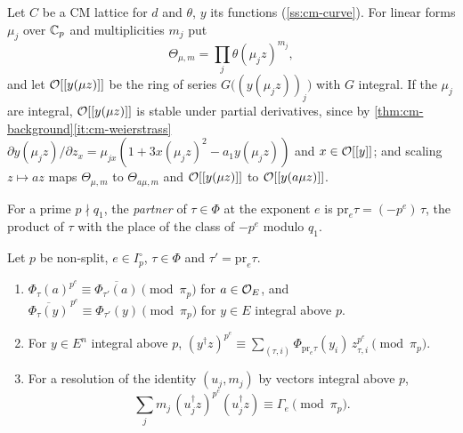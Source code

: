 Let $C$ be a CM lattice for $d$ and $\theta$, $y$ its functions (\cref{ss:cm-curve}). For linear forms
$\mu_j$ over $\mathbb{C}_p$ and multiplicities $m_j$ put
\[
  \Theta_{\mu,m}=\prod_j\theta(\mu_jz)^{m_j},
\]
and let $\mathcal{O}[[y(\mu z)]]$ be the ring of series $G\bigl((y(\mu_jz))_j\bigr)$ with $G$ integral. If the
$\mu_j$ are integral, $\mathcal{O}[[y(\mu z)]]$ is stable under partial derivatives, since by
\cref{thm:cm-background}\ref{it:cm-weierstrass} $\partial y(\mu_jz)/\partial z_x=\mu_{jx}(1+3x(\mu_jz)^2-
a_1y(\mu_jz))$ and $x\in\mathcal{O}[[y]]$; and scaling $z\mapsto az$ maps $\Theta_{\mu,m}$ to $\Theta_{a\mu,m}$
and $\mathcal{O}[[y(\mu z)]]$ to $\mathcal{O}[[y(a\mu z)]]$.

For a prime $p\nmid q_1$, the \emph{partner} of $\tau\in\Phi$ at the exponent $e$ is
$\mathrm{pr}_e\tau=(-p^e)\,\tau$, the product of $\tau$ with the place of the class of $-p^e$ modulo
$q_1$.

\begin{lemma}[Partners]\label{lem:partners}
Let $p$ be non-split, $e\in I_p^\circ$, $\tau\in\Phi$ and $\tau'=\mathrm{pr}_e\tau$.
\begin{enumerate}[label=\textup{(\alph*)}]
\item $\Phi_\tau(a)^{p^e}\equiv\overline{\Phi_{\tau'}(a)}\pmod{\pi_p}$ for $a\in\mathcal{O}_E$, and
$\overline{\Phi_\tau(y)}^{\,p^e}\equiv\Phi_{\tau'}(y)\pmod{\pi_p}$ for $y\in E$ integral above $p$.
\item For $y\in E^n$ integral above $p$,
$(y^\dagger z)^{p^e}\equiv\sum_{(\tau,i)}\Phi_{\mathrm{pr}_e\tau}(y_i)\,z_{\tau,i}^{p^e}\pmod{\pi_p}$.
\item For a resolution of the identity $(u_j,m_j)$ by vectors integral above $p$,
\[
  \sum_jm_j\,(u_j^\dagger z)^{p^e}(u_j^\dagger z)\equiv\Gamma_e\pmod{\pi_p}.
\]
\end{enumerate}
\end{lemma}

